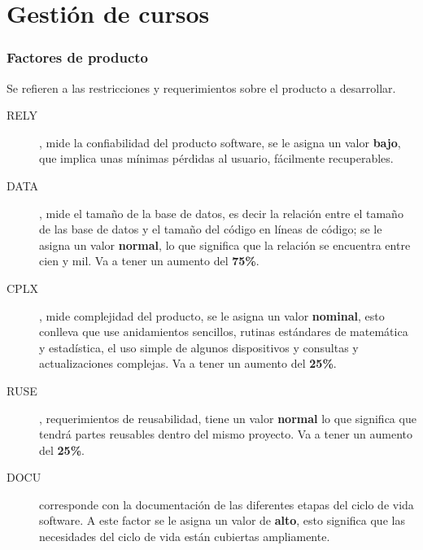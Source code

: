\documentclass[11pt,a4paper,spanish,twoside]{book}
\begin{document}
\section{Gestión de cursos}
\subsubsection{Factores de producto}
Se refieren a las restricciones y requerimientos sobre el producto a
desarrollar.
\begin{description}
\item[RELY], mide la confiabilidad del producto software, se le asigna un 
valor \textbf{bajo}, que implica unas mínimas pérdidas al usuario,
fácilmente recuperables.

\item[DATA], mide el tamaño de la base de datos, es decir la relación entre
el tamaño de las base de datos y el tamaño del código en líneas de código; se
le asigna un valor \textbf{normal}, lo que significa que la relación se encuentra entre cien y mil. Va a tener un aumento del \textbf{75\%}.

\item[CPLX], mide complejidad del producto, se le asigna un
valor \textbf{nominal}, esto conlleva que use anidamientos sencillos, rutinas
estándares de matemática y estadística, el uso simple de algunos dispositivos
y consultas y actualizaciones complejas. Va a tener un aumento del 
\textbf{25\%}.

\item[RUSE], requerimientos de reusabilidad, tiene un valor \textbf{normal}
lo que significa que tendrá partes reusables dentro del mismo
proyecto. Va a tener un aumento del \textbf{25\%}.

\item[DOCU] corresponde con la documentación de las diferentes etapas del
ciclo de vida software. A este factor se le asigna un valor de \textbf{alto},
esto significa que las necesidades del ciclo de vida están cubiertas
ampliamente.

\end{description}
\end{document}
